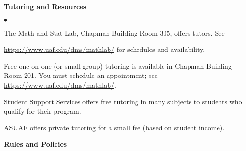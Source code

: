 \documentclass[12pt]{article}
\renewcommand{\emph}[1]{\textsf{\textbf{#1}}}
\newcommand{\localhead}[1]{\par\smallskip\textbf{#1}\nobreak\\}%
\def\heading#1{\localhead{\large\emph{#1}}}
\def\subheading#1{\localhead{\emph{#1}}}
\newenvironment{clist}%
{\bgroup\parskip 0pt\begin{list}{$\bullet$}{\partopsep 4pt\topsep 0pt\itemsep -2pt}}%
{\end{list}\egroup}%
\begin{document}
\heading{Tutoring and Resources}
\vskip -30pt\strut
\begin{clist}
	\item The Math and Stat Lab, Chapman Building Room 305, offers tutors. 
	See 

	\url{https://www.uaf.edu/dms/mathlab/} for schedules and availability.
	\item Free
one-on-one (or small group) tutoring is available in 
Chapman Building Room 201. You must schedule an
appointment; see \url{https://www.uaf.edu/dms/mathlab/}.
	\item Student Support Services offers free tutoring in many subjects to students who qualify for their program.
	\item ASUAF offers private tutoring for a small fee (based on student income).
\end{clist}

\heading{Rules and Policies}
\vskip -20pt


\end{document}

